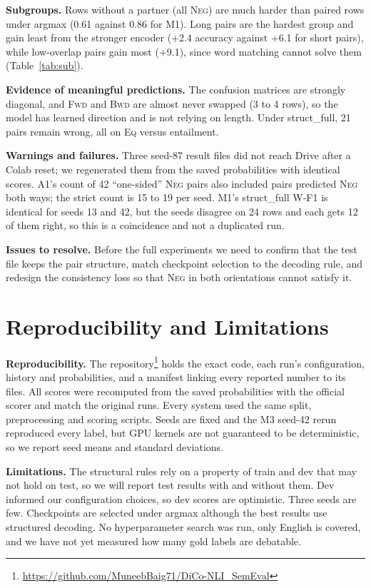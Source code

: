 \documentclass[10pt,a4paper,twocolumn]{article}
\newcommand{\Eq}{\textsc{Eq}}
\newcommand{\Fwd}{\textsc{Fwd}}
\newcommand{\Bwd}{\textsc{Bwd}}
\newcommand{\Neg}{\textsc{Neg}}
\begin{document}
\textbf{Subgroups.} Rows without a partner (all \Neg) are much harder than paired rows under argmax (0.61 against 0.86 for M1). Long pairs are the hardest group and gain least from the stronger encoder (+2.4 accuracy against +6.1 for short pairs), while low-overlap pairs gain most (+9.1), since word matching cannot solve them (Table~\ref{tab:sub}).

\textbf{Evidence of meaningful predictions.} The confusion matrices are strongly diagonal, and \Fwd{} and \Bwd{} are almost never swapped (3 to 4 rows), so the model has learned direction and is not relying on length. Under struct\_full, 21 pairs remain wrong, all on \Eq{} versus entailment.

\textbf{Warnings and failures.} Three seed-87 result files did not reach Drive after a Colab reset; we regenerated them from the saved probabilities with identical scores. A1's count of 42 ``one-sided'' \Neg{} pairs also included pairs predicted \Neg{} both ways; the strict count is 15 to 19 per seed. M1's struct\_full W-F1 is identical for seeds 13 and 42, but the seeds disagree on 24 rows and each gets 12 of them right, so this is a coincidence and not a duplicated run.

\textbf{Issues to resolve.} Before the full experiments we need to confirm that the test file keeps the pair structure, match checkpoint selection to the decoding rule, and redesign the consistency loss so that \Neg{} in both orientations cannot satisfy it.

\section{Reproducibility and Limitations}
\label{sec:repro}

\textbf{Reproducibility.} The repository\footnote{\url{https://github.com/MuneebBaig71/DiCo-NLI_SemEval}} holds the exact code, each run's configuration, history and probabilities, and a manifest linking every reported number to its files. All scores were recomputed from the saved probabilities with the official scorer and match the original runs. Every system used the same split, preprocessing and scoring scripts. Seeds are fixed and the M3 seed-42 rerun reproduced every label, but GPU kernels are not guaranteed to be deterministic, so we report seed means and standard deviations.

\textbf{Limitations.} The structural rules rely on a property of train and dev that may not hold on test, so we will report test results with and without them. Dev informed our configuration choices, so dev scores are optimistic. Three seeds are few. Checkpoints are selected under argmax although the best results use structured decoding. No hyperparameter search was run, only English is covered, and we have not yet measured how many gold labels are debatable.
\end{document}
